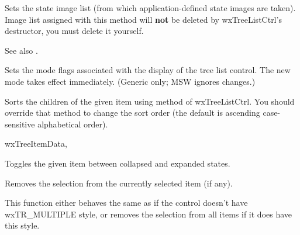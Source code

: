Sets the state image list (from which application-defined state images are taken).
Image list assigned with this method will
{\bf not} be deleted by wxTreeListCtrl's destructor, you must delete it yourself.

See also .


Sets the mode flags associated with the display of the tree list control.
The new mode takes effect immediately.
(Generic only; MSW ignores changes.)

\label{wxtreelistctrlsortchildren}


Sorts the children of the given item using
 method of wxTreeListCtrl. You
should override that method to change the sort order (the default is ascending
case-sensitive alphabetical order).


wxTreeItemData, 

\label{wxtreelistctrltoggle}


Toggles the given item between collapsed and expanded states.

\label{wxtreelistctrlunselect}


Removes the selection from the currently selected item (if any).

\label{wxtreelistctrlunselectall}


This function either behaves the same as 
if the control doesn't have wxTR\_MULTIPLE style, or removes the selection from
all items if it does have this style.


\label{wxtreelistctrladdcolumn}


